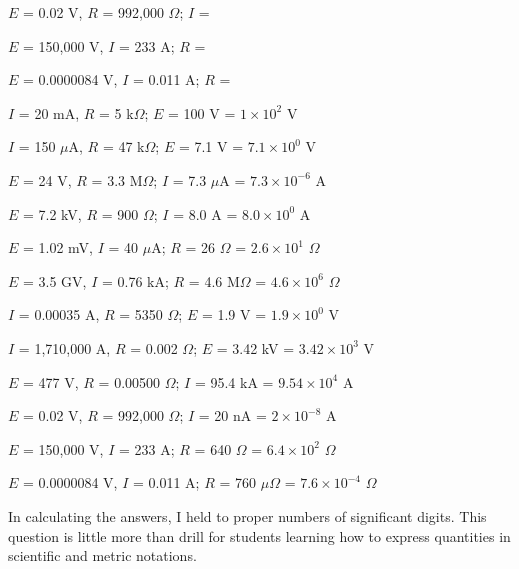 $E$ = 0.02 V, $R$ = 992,000 $\Omega$; \hskip 15pt $I$ = 

\vskip 10pt

$E$ = 150,000 V, $I$ = 233 A; \hskip 15pt $R$ = 

\vskip 10pt

$E$ = 0.0000084 V, $I$ = 0.011 A; \hskip 15pt $R$ = 

\vskip 10pt







$I$ = 20 mA, $R$ = 5 k$\Omega$; \hskip 15pt $E$ = 100 V = $1 \times 10^2$ V

\vskip 10pt

$I$ = 150 $\mu$A, $R$ = 47 k$\Omega$; \hskip 15pt $E$ = 7.1 V = $7.1 \times 10^0$ V

\vskip 10pt

$E$ = 24 V, $R$ = 3.3 M$\Omega$; \hskip 15pt $I$ = 7.3 $\mu$A = $7.3 \times 10^{-6}$ A

\vskip 10pt

$E$ = 7.2 kV, $R$ = 900 $\Omega$; \hskip 15pt $I$ = 8.0 A = $8.0 \times 10^0$ A

\vskip 10pt

$E$ = 1.02 mV, $I$ = 40 $\mu$A; \hskip 15pt $R$ = 26 $\Omega$ = $2.6 \times 10^1$ $\Omega$

\vskip 10pt

$E$ = 3.5 GV, $I$ = 0.76 kA; \hskip 15pt $R$ = 4.6 M$\Omega$ = $4.6 \times 10^6$ $\Omega$

\vskip 10pt

$I$ = 0.00035 A, $R$ = 5350 $\Omega$; \hskip 15pt $E$ = 1.9 V = $1.9 \times 10^0$ V

\vskip 10pt

$I$ = 1,710,000 A, $R$ = 0.002 $\Omega$; \hskip 15pt $E$ = 3.42 kV = $3.42 \times 10^3$ V

\vskip 10pt

$E$ = 477 V, $R$ = 0.00500 $\Omega$; \hskip 15pt $I$ = 95.4 kA = $9.54 \times 10^4$ A

\vskip 10pt

$E$ = 0.02 V, $R$ = 992,000 $\Omega$; \hskip 15pt $I$ = 20 nA = $2 \times 10^{-8}$ A

\vskip 10pt

$E$ = 150,000 V, $I$ = 233 A; \hskip 15pt $R$ = 640 $\Omega$ = $6.4 \times 10^2$ $\Omega$

\vskip 10pt

$E$ = 0.0000084 V, $I$ = 0.011 A; \hskip 15pt $R$ = 760 $\mu \Omega$ = $7.6 \times 10^{-4}$ $\Omega$







In calculating the answers, I held to proper numbers of significant digits.  This question is little more than drill for students learning how to express quantities in scientific and metric notations.




